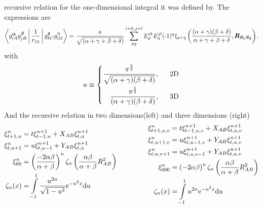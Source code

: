    recursive relation for the one-dimensional integral it was defined by. The
    expressions are
        \begin{equation}
            \Braket{g^{\blds{\alpha}}_{iA}g^{\blds{\beta}}_{jB} |
            \frac{1}{r_{12}} | g^{\blds{\delta}}_{kC}g^{\blds{\gamma}}_{lD}} =
            \frac{a}{\sqrt{(\alpha+\gamma+\beta+\delta)}} \suml{pq}{i+k,j+l}
            E^{ik}_pE^{jl}_q (\scalebox{1.0}[1.0]{-}1)^{q} \xi_{p+q}\left(\frac{(\alpha +
            \gamma)(\beta + \delta)}{\alpha + \gamma + \beta +
            \delta},\blds{R_{S_1S_2}}\right).
            \label{eq:coulombdistintdefsum}
        \end{equation}
    with
        \begin{equation}
            a \equiv \left\{\begin{aligned}
                \frac{\pi^{\frac{3}{2}}}
                {\sqrt{(\alpha+\gamma)(\beta+\delta)}},\indent \text{2D} \\
                \frac{\pi^{\frac{5}{2}}}
                {(\alpha+\gamma)(\beta+\delta)},\indent \text{3D} \\
            \end{aligned}\right.
        \end{equation}
    And the recursive relation in two dimensions(left) and three dimensions
    (right)
        \begin{equation}
            \begin{aligned}
                \xi^n_{t+1,u} &= t\xi^{n+1}_{t-1,u} + X_{AB}\xi^{n+1}_{t,u} \\
                \xi^n_{t,u+1} &= u\xi^{n+1}_{t,u-1} + Y_{AB}\xi^{n+1}_{t,u} \\
                \xi^n_{00} &= \left(\frac{-2\alpha\beta}{\alpha+\beta}\right)^n
                \zeta_n\left(\frac{\alpha\beta}{\alpha+\beta} R^2_{AB}\right) \\
                \zeta_n(x) &= \int\limits^1_{-1} \frac{u^{2n}}{\sqrt{1 -
                u^2}} \me^{-u^2x} \md u
            \end{aligned} \indent\indent\indent 
            \begin{aligned}
                \xi^n_{t+1,u,v} &= t\xi^{n+1}_{t-1,u,v} + X_{AB}\xi^{n+1}_{t,u,v} \\
                \xi^n_{t,u+1,v} &= u\xi^{n+1}_{t,u-1,v} + Y_{AB}\xi^{n+1}_{t,u,v} \\
                \xi^n_{t,u,v+1} &= u\xi^{n+1}_{t,u,v-1} + Y_{AB}\xi^{n+1}_{t,u,v} \\
                \xi^n_{000} &= \left(-2\alpha\beta\right)^n
                \zeta_n\left(\frac{\alpha\beta}{\alpha+\beta} R^2_{AB}\right)
                \\
                \zeta_n(x) &= \int\limits^1_{-1} u^{2n} \me^{-u^2x} \md u
            \end{aligned}
        \end{equation}

